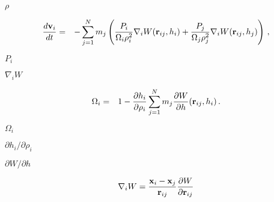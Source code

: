 \documentclass{article}
\begin{document}
$\rho$
\pagebreak

\begin{eqnarray} \frac{d{\bf v}_i }{dt} &=& - \sum \limits_{j=1}^{N} m_j \left( \frac{P_i}{\Omega_i \rho_i^2} \nabla_i W({\bf r}_{ij} ,h_i) + \frac{P_j}{\Omega_j \rho_j^2} \nabla_i W({\bf r}_{ij} ,h_j) \right) \,, \end{eqnarray}
\pagebreak

$P_i$
\pagebreak

$\nabla_i W$
\pagebreak

\begin{eqnarray} \Omega_i &=& 1 - \frac{\partial h_i }{\partial \rho_i } \sum \limits_{j=1}^{N} m_j \frac{\partial W}{\partial h} ({\bf r}_{ij} , h_i )\,. \end{eqnarray}
\pagebreak

$\Omega_i$
\pagebreak

$\partial h_i / \partial \rho_i$
\pagebreak

$\partial W / \partial h$
\pagebreak

\[ \nabla_i W=\frac{\mathbf{x}_i-\mathbf{x}_j}{{\bf r}_{ij}} \frac{\partial W}{\partial {\bf r}_{ij}} \]
\pagebreak
\end{document}
